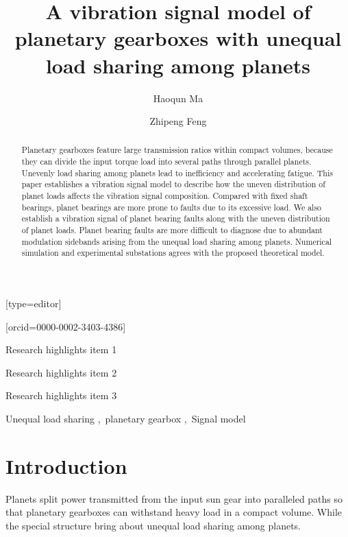 \documentclass[a4paper,fleqn]{cas-sc}%
\begin{document}
\let\WriteBookmarks\relax
\def\floatpagepagefraction{1}
\def\textpagefraction{.001}
\title[mode = title]{A vibration signal model of planetary gearboxes with unequal load sharing among planets}
\author[1]{Haoqun Ma}[type=editor]
\address[1]{University of Science and Technology Beijing, No.30, Xueyuan Road, Haidian District, Beijing.}
\author[1]{Zhipeng Feng}[orcid=0000-0002-3403-4386]
\cormark[1]
%
%
% 
\begin{abstract}
    Planetary gearboxes feature large transmission ratios within compact volumes, because they can divide the input torque load into several paths through parallel planets. Unevenly load sharing among planets lead to inefficiency and accelerating fatigue. This paper establishes a vibration signal model to describe how the uneven distribution of planet loads affects the vibration signal composition. Compared with fixed shaft bearings, planet bearings are more prone to faults due to its excessive load. We also establish a vibration signal of planet bearing faults along with the uneven distribution of planet loads. Planet bearing faults are more difficult to diagnose due to abundant modulation sidebands arising from the unequal load sharing among planets. Numerical simulation and experimental substations agrees with the proposed theoretical model.
\end{abstract}
\begin{highlights}
    \item Research highlights item 1
    \item Research highlights item 2
    \item Research highlights item 3
\end{highlights}
\begin{keywords}
    Unequal load sharing \sep\ planetary gearbox \sep\ Signal model
\end{keywords}
    
\maketitle
\section{Introduction}
\par Planets split power transmitted from the input sun gear into paralleled paths so that planetary gearboxes can withstand heavy load in a compact volume. While the special structure bring about unequal load sharing among planets.
\end{document}
